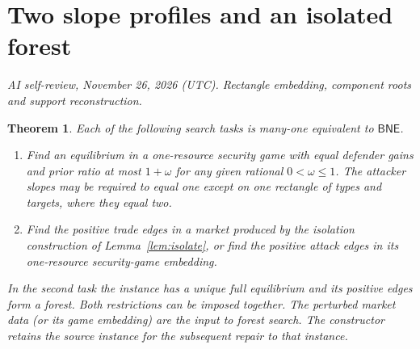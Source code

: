 \documentclass[11pt,oneside,openany,notitlepage]{report}
\newtheorem{theorem}{Theorem}[chapter]
\newcommand{\BNE}{\mathsf{BNE}}
\newcommand{\reviewdate}{November 26, 2026 (UTC)}
\newcommand{\reviewmark}[1]{\par\nopagebreak[4]\noindent
  {\footnotesize\itshape AI self-review, \reviewdate. #1\par}\nobreak\smallskip}
\begin{document}
\section{Two slope profiles and an isolated forest}
\reviewmark{Rectangle embedding, component roots and support reconstruction.}
\begin{theorem}\label{thm:forms}
Each of the following search tasks is many-one equivalent to \(\BNE\).
\begin{enumerate}
\item Find an equilibrium in a one-resource security game with equal
defender gains and prior ratio at most \(1+\omega\) for any given rational \(0<\omega\le1\). The attacker slopes may
be required to equal one except on one rectangle of types and targets,
where they equal two.
\item Find the positive trade edges in a market produced by the isolation
construction of Lemma~\ref{lem:isolate}, or find the positive attack edges
in its one-resource security-game embedding.
\end{enumerate}
In the second task the instance has a unique full equilibrium and its
positive edges form a forest. Both restrictions can be imposed together.
The perturbed market data (or its game embedding) are the input to
forest search. The constructor retains the source instance for the
subsequent repair to that instance.
\end{theorem}
\end{document}
